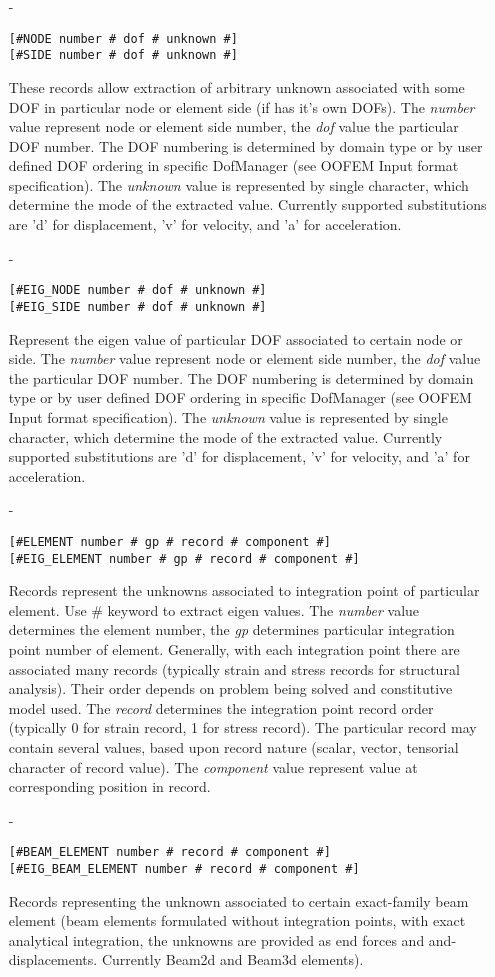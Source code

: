 \begin{itemize}
\item[-]
\begin{verbatim}
[#NODE number # dof # unknown #]
[#SIDE number # dof # unknown #]
\end{verbatim}
These records allow extraction of arbitrary unknown associated with
some DOF in particular node or element side (if has it's own DOFs).
The {\em number} value represent node or element side number, the {\em
dof} value the particular DOF number. The DOF numbering is determined
by domain type or by user defined DOF ordering in specific
DofManager (see OOFEM Input format specification). The {\em unknown} value
is represented by single character, which determine the mode of the
extracted value. Currently supported substitutions are 'd' for displacement, 'v' for velocity,
and 'a' for acceleration.
\item[-]
\begin{verbatim}
[#EIG_NODE number # dof # unknown #]
[#EIG_SIDE number # dof # unknown #]
\end{verbatim}
Represent the eigen value of particular DOF associated to certain
node or side. The {\em number} value represent node or element side number, the {\em
dof} value the particular DOF number. The DOF numbering is determined
by domain type or by user defined DOF ordering in specific
DofManager (see OOFEM Input format specification). The {\em unknown} value
is represented by single character, which determine the mode of the
extracted value. Currently supported substitutions are 'd' for displacement, 'v' for velocity,
and 'a' for acceleration.
\item[-]
\begin{verbatim}
[#ELEMENT number # gp # record # component #]
[#EIG_ELEMENT number # gp # record # component #]
\end{verbatim}
Records represent the unknowns associated to integration point of
particular element. Use \# keyword  to extract eigen
values. The {\em number} value determines the element number, the {\em
gp} determines particular integration point number of element. 
Generally, with each integration point there are associated many
records (typically strain and stress records for structural
analysis). Their order depends on problem being solved and
constitutive model used. The {\em record} determines the integration
point record order (typically 0 for strain record, 1 for stress
record). The particular record may contain several values, based upon
record nature (scalar, vector, tensorial character of record value).
The {\em  component} value represent value at corresponding position
in record. 
\item[-]
\begin{verbatim}
[#BEAM_ELEMENT number # record # component #]
[#EIG_BEAM_ELEMENT number # record # component #]
\end{verbatim}
Records representing the unknown associated to certain exact-family beam
element (beam elements formulated without integration points, with
exact analytical integration, the unknowns are provided as end forces
and and-displacements. Currently Beam2d and Beam3d elements). 


\end{itemize}
